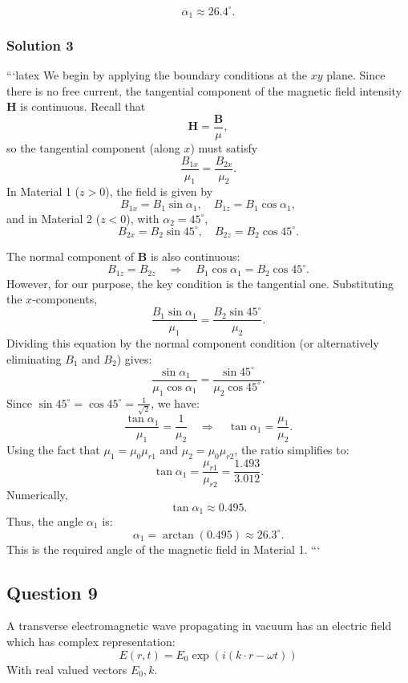 \documentclass{article}
\begin{document}
\[
\boxed{\alpha_1 \approx 26.4^\circ.}
\]

\subsubsection{Solution 3}
```latex
We begin by applying the boundary conditions at the \(xy\) plane. Since there is no free current, the tangential component of the magnetic field intensity \(\mathbf{H}\) is continuous. Recall that
\[
\mathbf{H} = \frac{\mathbf{B}}{\mu},
\]
so the tangential component (along \(x\)) must satisfy
\[
\frac{B_{1x}}{\mu_1} = \frac{B_{2x}}{\mu_2}.
\]
In Material 1 (\(z>0\)), the field is given by
\[
B_{1x} = B_1 \sin\alpha_1, \quad B_{1z} = B_1 \cos\alpha_1,
\]
and in Material 2 (\(z<0\)), with \(\alpha_2 = 45^\circ\),
\[
B_{2x} = B_2 \sin 45^\circ, \quad B_{2z} = B_2 \cos 45^\circ.
\]

The normal component of \(\mathbf{B}\) is also continuous:
\[
B_{1z} = B_{2z} \quad \Longrightarrow \quad B_1 \cos\alpha_1 = B_2 \cos 45^\circ.
\]
However, for our purpose, the key condition is the tangential one. Substituting the \(x\)-components,
\[
\frac{B_1 \sin\alpha_1}{\mu_1} = \frac{B_2 \sin 45^\circ}{\mu_2}.
\]
Dividing this equation by the normal component condition (or alternatively eliminating \(B_1\) and \(B_2\)) gives:
\[
\frac{\sin\alpha_1}{\mu_1 \cos\alpha_1} = \frac{\sin 45^\circ}{\mu_2 \cos 45^\circ}.
\]
Since \(\sin 45^\circ = \cos 45^\circ = \frac{1}{\sqrt{2}}\), we have:
\[
\frac{\tan\alpha_1}{\mu_1} = \frac{1}{\mu_2} \quad \Longrightarrow \quad \tan\alpha_1 = \frac{\mu_1}{\mu_2}.
\]
Using the fact that \(\mu_1 = \mu_0 \mu_{r1}\) and \(\mu_2 = \mu_0 \mu_{r2}\), the ratio simplifies to:
\[
\tan\alpha_1 = \frac{\mu_{r1}}{\mu_{r2}} = \frac{1.493}{3.012}.
\]
Numerically,
\[
\tan\alpha_1 \approx 0.495.
\]
Thus, the angle \(\alpha_1\) is:
\[
\alpha_1 = \arctan(0.495) \approx 26.3^\circ.
\]
This is the required angle of the magnetic field in Material 1.
```

\subsection{Question 9}
A transverse electromagnetic wave propagating in vacuum has an electric field which has complex representation:
\[
E(r, t) = E_0 \exp(i (k \cdot r - \omega t))
\]
With real valued vectors \(E_0, k\).
\end{document}
